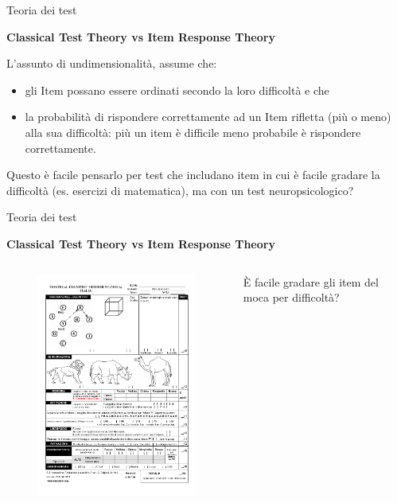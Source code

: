 \documentclass[
  ignorenonframetext,
]{beamer}
\begin{document}
\begin{frame}{Teoria dei test}
\label{teoria-dei-test-9}
\begin{center}
  \textbf{Classical Test Theory vs Item Response Theory}
\end{center}

L'assunto di undimensionalità, assume che:

\begin{itemize}[<*>] %
\item gli Item possano essere ordinati secondo la loro difficoltà e che
\item la probabilità di rispondere correttamente ad un Item rifletta (più o meno) alla sua difficoltà: più un item è difficile meno probabile è rispondere correttamente.
\end{itemize}

Questo è facile pensarlo per test che includano item in cui è facile
gradare la difficoltà (es. esercizi di matematica), ma con un test
neuropsicologico?
\end{frame}

\begin{frame}{Teoria dei test}
\label{teoria-dei-test-10}
\begin{center}
  \textbf{Classical Test Theory vs Item Response Theory}
\end{center}
\vspace{2em}

\begin{columns}
  \begin{column}{0.5\textwidth}
    \begin{figure}
    \includegraphics[scale=0.5]{Figures/MOCA.png}
    \end{figure}
  \end{column}
  \begin{column}{0.5\textwidth}
    È facile gradare gli item del moca per difficoltà?
  \end{column}
\end{columns}
\end{frame}
\end{document}
